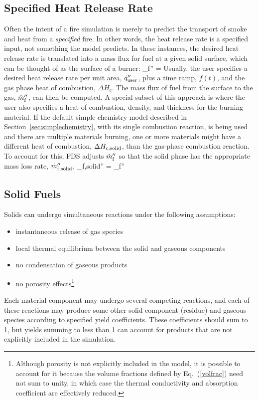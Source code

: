 \subsection{Specified Heat Release Rate}

Often the intent of a fire simulation is merely to predict the transport of smoke and heat from a {\em specified} fire. In other words, the heat release rate is a specified input, not something the model predicts. In these instances, the desired heat release rate is translated into a mass flux for fuel at a given solid surface, which can be thought of as the surface of a burner:
\be
   \dm_{\rm f}'' = 
\ee
Usually, the user specifies a desired heat release rate per unit area, $\dot{q}_{\rm user}''$, plus a time ramp, $f(t)$, and the gas phase heat of combustion, $\Delta H_{\si{c}}$. The mass flux of fuel from the surface to the gas, $\dot{m}_{\rm f}''$, can then be computed. A special subset of this approach is where the user also specifies a heat of combustion, density, and thickness for the burning material. If the default simple chemistry model described in Section~\ref{sec:simplechemistry}, with its single combustion reaction, is being used and there are multiple materials burning, one or more materials might have a different heat of combustion, $\Delta H_{\si{c}{\rm ,solid}}$, than the gas-phase combustion reaction. To account for this, FDS adjusts $\dot{m}_{\rm f}''$ so that the solid phase has the appropriate mass loss rate, $\dot{m}_{\rm f,solid}''$.
\be
\dm_{\rm f,solid}'' = \dm_{\rm f}'' 
\ee

\subsection{Solid Fuels}

Solids can undergo simultaneous reactions under the following assumptions:
\begin{itemize}
\setlength{\itemsep}{0.0in}
\item instantaneous release of gas species
\item local thermal equilibrium between the solid and gaseous components
\item no condensation of gaseous products
\item no porosity effects\footnote{Although porosity is not explicitly included in the model, it is possible to account for it because the volume fractions defined by Eq.~(\ref{volfrac}) need not sum to unity, in which case the thermal conductivity and absorption coefficient are effectively reduced.}
\end{itemize}
Each material component may undergo several competing reactions, and each of these reactions may produce some other solid component (residue) and gaseous species according to specified yield coefficients.  These coefficients should sum to 1, but yields summing to less than 1 can account for products that are not explicitly included in the simulation.

